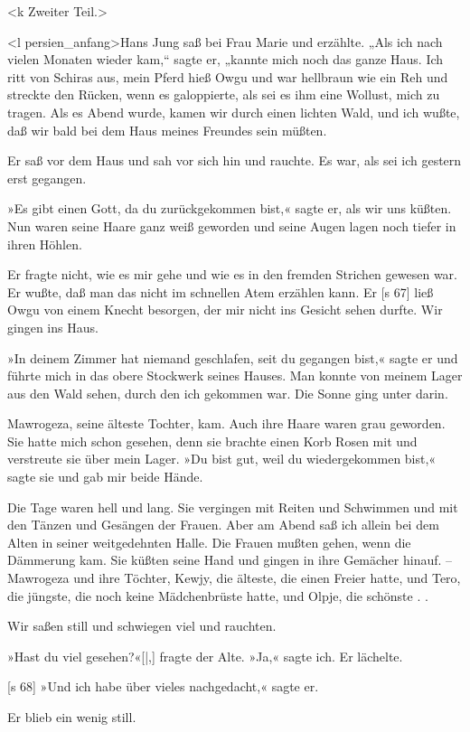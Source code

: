 <k Zweiter Teil.>


<l persien_anfang>Hans Jung saß bei Frau Marie und erzählte.
„Als ich nach vielen Monaten wieder kam,“
sagte er, „kannte mich noch das ganze Haus. Ich
ritt von Schiras aus, mein Pferd hieß Owgu und war
hellbraun wie ein Reh und streckte den Rücken, wenn
es galoppierte, als sei es ihm eine Wollust, mich zu
tragen. Als es Abend wurde, kamen wir durch einen
lichten Wald, und ich wußte, daß wir bald bei dem
Haus meines Freundes sein müßten.

Er saß vor dem Haus und sah vor sich hin und
rauchte. Es war, als sei ich gestern erst gegangen.

»Es gibt einen Gott, da du zurückgekommen
bist,« sagte er, als wir uns küßten. Nun waren seine
Haare ganz weiß geworden und seine Augen lagen
noch tiefer in ihren Höhlen.

Er fragte nicht, wie es mir gehe und wie es in
den fremden Strichen gewesen war. Er wußte, daß
man das nicht im schnellen Atem erzählen kann. Er
[s 67]
ließ Owgu von einem Knecht besorgen, der mir nicht
ins Gesicht sehen durfte. Wir gingen ins Haus.

»In deinem Zimmer hat niemand geschlafen,
seit du gegangen bist,« sagte er und führte mich in
das obere Stockwerk seines Hauses. Man konnte von
meinem Lager aus den Wald sehen, durch den ich
gekommen war. Die Sonne ging unter darin.

Mawrogeza, seine älteste Tochter, kam. Auch
ihre Haare waren grau geworden. Sie hatte mich
schon gesehen, denn sie brachte einen Korb Rosen
mit und verstreute sie über mein Lager. »Du bist
gut, weil du wiedergekommen bist,« sagte sie und
gab mir beide Hände.

Die Tage waren hell und lang. Sie vergingen
mit Reiten und Schwimmen und mit den Tänzen und
Gesängen der Frauen. Aber am Abend saß ich
allein bei dem Alten in seiner weitgedehnten Halle.
Die Frauen mußten gehen, wenn die Dämmerung
kam. Sie küßten seine Hand und gingen in ihre
Gemächer hinauf. – Mawrogeza und ihre Töchter,
Kewjy, die älteste, die einen Freier hatte, und Tero,
die jüngste, die noch keine Mädchenbrüste hatte, und
Olpje, die schönste . .

Wir saßen still und schwiegen viel und rauchten.

»Hast du viel gesehen?«[|,] fragte der Alte. »Ja,«
sagte ich. Er lächelte.

[s 68]
»Und ich habe über vieles nachgedacht,« sagte er.

Er blieb ein wenig still.

